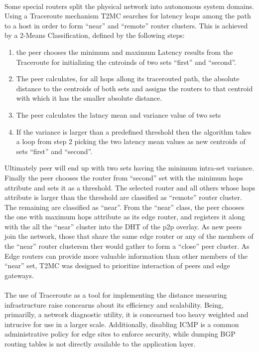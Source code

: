 \documentclass[a4paper,10pt]{article}
\begin{document}
\paragraph{}
Some special routers split the physical network into autonomous system domains. Using a Traceroute mechanism T2MC searches for latency leaps among the path to a host in order to form ``near'' and ``remote'' router clusters. This is achieved by a 2-Means Classification, defined by the following steps:
\begin{enumerate}
 \item the peer chooses the minimum and maximum Latency results from the Traceroute for initializing the cntroinds of two sets ``first'' and ``second''.
 \item The peer calculates, for all hops allong its tracerouted path, the absolute distance to the centroids of both sets and assigns the routers to that centroid with which it has the smaller absolute distance.
 \item The peer calculates the latncy mean and variance value of two sets
 \item If the variance is larger than a predefined threshold then the algorithm takes a loop from step 2 picking the two latency mean values as new centroids of sets ``first'' and ``second''.
\end{enumerate}
Ultimately peer will end up with two sets having the minimum intra-set variance. Finally the peer chooses the router from ``second'' set with the minimum hops attribute and sets it as a threshold. The selected router and all others whose hops attribute is larger than the threshold are classified as ``remote'' router cluster. The remaining are classified as ``near''. From the ``near'' class, the peer chooses the one with maximum hops attribute as its edge router, and registers it along with the all the ``near'' cluster into the DHT of the p2p overlay. As new peers join the network, those that share the same edge router or any of the members of the ``near'' router clustersm ther would gather to form a ``close'' peer cluster. As Edge routers can provide more valuable information than other members of the ``near'' set, T2MC was designed to prioritize interaction of peers and edge gateways.


\paragraph{}
The use of Traceroute as a tool for implementing the distance measuring infrastructure raise concearns about its efficiency and scalability. Being, primarilly, a network diagnostic utility, it is concearned too heavy weighted and intrucive for use in a larger scale\cite{ratnasamy_binning_2002}. Additionally, disabling ICMP is a common administrative policy for edge sites to enforce security, while dumping BGP routing tables\cite{krishnamurthy_bgpclust_2000} is not directly available to the application layer.
\end{document}
